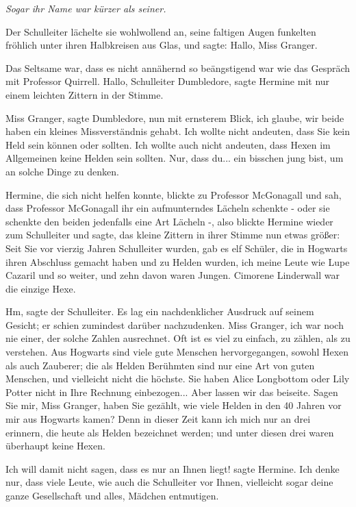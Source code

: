 \emph{Sogar ihr Name war kürzer als seiner.}

Der Schulleiter lächelte sie wohlwollend an, seine faltigen Augen funkelten
fröhlich unter ihren Halbkreisen aus Glas, und sagte: \glqq Hallo, Miss
Granger.\grqq{}

Das Seltsame war, dass es nicht annähernd so beängstigend war wie das Gespräch
mit Professor Quirrell. \glqq Hallo, Schulleiter Dumbledore\grqq{}, sagte
Hermine mit nur einem leichten Zittern in der Stimme.

\glqq Miss Granger\grqq{}, sagte Dumbledore, nun mit ernsterem Blick, \glqq ich
glaube, wir beide haben ein kleines Missverständnis gehabt. Ich wollte nicht
andeuten, dass Sie kein Held sein können oder sollten. Ich wollte auch nicht
andeuten, dass Hexen im Allgemeinen keine Helden sein sollten. Nur, dass du...
ein bisschen jung bist, um an solche Dinge zu denken.\grqq{}

Hermine, die sich nicht helfen konnte, blickte zu Professor McGonagall und sah,
dass Professor McGonagall ihr ein aufmunterndes Lächeln schenkte - oder sie
schenkte den beiden jedenfalls eine Art Lächeln -, also blickte Hermine wieder
zum Schulleiter und sagte, das kleine Zittern in ihrer Stimme nun etwas größer:
\glqq Seit Sie vor vierzig Jahren Schulleiter wurden, gab es elf Schüler, die in
Hogwarts ihren Abschluss gemacht haben und zu Helden wurden, ich meine Leute wie
Lupe Cazaril und so weiter, und zehn davon waren Jungen. Cimorene Linderwall war
die einzige Hexe.\grqq{}

\glqq Hm\grqq{}, sagte der Schulleiter. Es lag ein nachdenklicher Ausdruck auf
seinem Gesicht; er schien zumindest darüber nachzudenken. \glqq Miss Granger,
ich war noch nie einer, der solche Zahlen ausrechnet. Oft ist es viel zu
einfach, zu zählen, als zu verstehen. Aus Hogwarts sind viele gute Menschen
hervorgegangen, sowohl Hexen als auch Zauberer; die als Helden Berühmten sind
nur eine Art von guten Menschen, und vielleicht nicht die höchste. Sie haben
Alice Longbottom oder Lily Potter nicht in Ihre Rechnung einbezogen... Aber
lassen wir das beiseite. Sagen Sie mir, Miss Granger, haben Sie gezählt, wie
viele Helden in den 40 Jahren vor mir aus Hogwarts kamen? Denn in dieser Zeit
kann ich mich nur an drei erinnern, die heute als Helden bezeichnet werden; und
unter diesen drei waren überhaupt keine Hexen.\grqq{}

\glqq Ich will damit nicht sagen, dass es nur an Ihnen liegt!\grqq{} sagte
Hermine. \glqq Ich denke nur, dass viele Leute, wie auch die Schulleiter vor
Ihnen, vielleicht sogar deine ganze Gesellschaft und alles, Mädchen
entmutigen.\grqq{}

